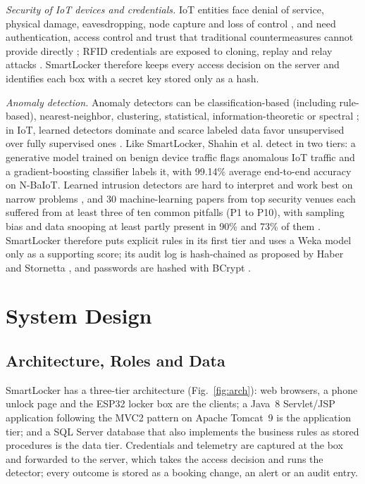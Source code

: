 \documentclass[sigconf,screen]{acmart}
\begin{document}
\textit{Security of IoT devices and credentials.} IoT entities face denial of service, physical damage, eavesdropping,
node capture and loss of control \cite{roman2013features}, and need authentication, access control and trust that
traditional countermeasures cannot provide directly \cite{sicari2015security}; RFID credentials are exposed to cloning,
replay and relay attacks \cite{mitrokotsa2010rfid}. SmartLocker therefore keeps every access decision on the server and
identifies each box with a secret key stored only as a hash.

\textit{Anomaly detection.} Anomaly detectors can be classification-based (including rule-based), nearest-neighbor,
clustering, statistical, information-theoretic or spectral \cite{chandola2009anomaly}; in IoT, learned detectors
dominate and scarce labeled data favor unsupervised over fully supervised ones \cite{demedeiros2023anomaly}. Like
SmartLocker, Shahin et al. \cite{shahin2025twostage} detect in two tiers: a generative model trained on benign device
traffic flags anomalous IoT traffic and a gradient-boosting classifier labels it, with 99.14\% average end-to-end
accuracy on N-BaIoT. Learned intrusion
detectors are hard to interpret and work best on narrow problems \cite{sommer2010outside}, and 30 machine-learning
papers from top security venues each suffered from at least three of ten common pitfalls (P1 to P10), with sampling bias and data
snooping at least partly present in 90\% and 73\% of them \cite{arp2022dos}. SmartLocker therefore puts explicit rules
in its first tier and uses a Weka model \cite{hall2009weka} only as a supporting score; its audit log is hash-chained as
proposed by Haber and Stornetta \cite{haber1991timestamp}, and passwords are hashed with BCrypt \cite{provos1999bcrypt}.

\section{System Design}\label{sec:design}

\subsection{Architecture, Roles and Data}

SmartLocker has a three-tier architecture (Fig.~\ref{fig:arch}): web browsers, a phone unlock page and the ESP32 locker
box are the clients; a Java~8 Servlet/JSP application following the MVC2 pattern on Apache Tomcat~9 is the
application tier; and a SQL Server database that also implements the business rules as stored procedures is the data
tier. Credentials and telemetry are captured at the box and forwarded to the server, which takes the access decision
and runs the detector; every outcome is stored as a booking change, an alert or an audit entry.
\end{document}
